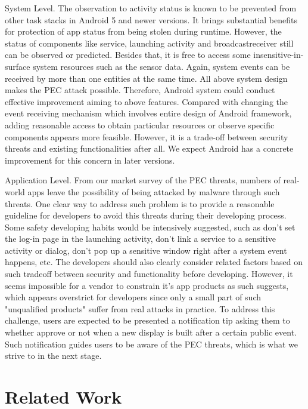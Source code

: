 \documentclass{sig-alternate-05-2015}
\begin{document}
System Level. The observation to activity status is known to be prevented from other task stacks in Android 5 and newer versions. It brings substantial benefits for protection of app status from being stolen during runtime. However, the status of components like service, launching activity and broadcastreceiver still can be observed or predicted. Besides that, it is free to access some insensitive-in-surface system resources such as the sensor data. Again, system events can be received by more than one entities at the same time. All above system design makes the PEC attack possible. Therefore,   Android system could conduct effective improvement aiming to above features. Compared with changing the event receiving mechanism which involves entire design of Android framework, adding reasonable access to obtain particular resources or observe specific components appears more feasible. However, it is a trade-off between security threats and existing functionalities after all. We expect Android has a concrete improvement for this concern in later versions.

Application Level. From our market survey of the PEC threats, numbers of real-world apps leave the possibility of being attacked by malware through such threats. One clear way to address such problem is to provide a reasonable guideline for developers to avoid this threats during their developing process. Some safety developing habits would be intensively suggested, such as don't set the log-in page in the launching activity, don't link a service to a sensitive activity or dialog, don't pop up a sensitive window right after a system event happens, etc. The developers should also clearly consider related factors based on such tradeoff between security and functionality before developing. However, it seems impossible for a vendor to constrain it's app products as such suggests, which appears overstrict for developers since only a small part of such "unqualified products" suffer from real attacks in practice. To address this challenge, users are expected to be presented a notification tip asking them to whether approve or not when a new display is built after a certain public event. Such notification guides users to be aware of the PEC threats, which is what we strive to in the next stage.

 


\section{Related Work}
\end{document}
